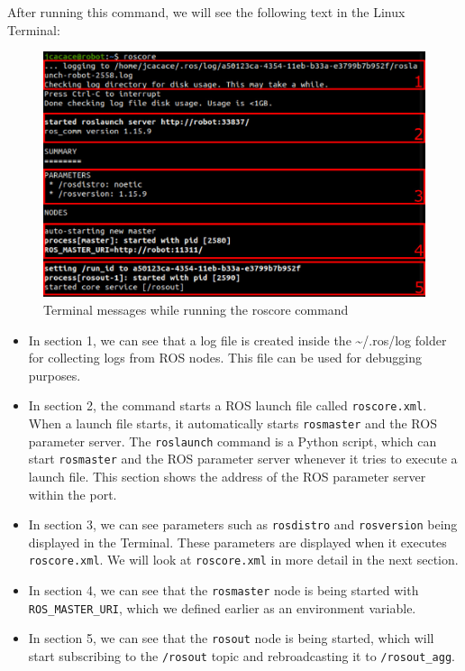 \documentclass[../../main]{subfiles}
\begin{document}
After running this command, we will see the following text in the Linux Terminal:
\begin{figure}[ht]
    \centering
    \includegraphics{img/roscore.jpg}
    \caption{Terminal messages while running the roscore command}
\end{figure}
\newpage
\begin{itemize}
    \item In section 1, we can see that a log file is created inside the \textasciitilde/.ros/log folder for collecting logs from ROS nodes. This file can be used for debugging purposes.
    \item In section 2, the command starts a ROS launch file called \texttt{roscore.xml}. When a launch file starts, it automatically starts \texttt{rosmaster} and the ROS parameter server. The \texttt{roslaunch} command is a Python script, which can start \texttt{rosmaster} and the ROS parameter server whenever it tries to execute a launch file. This section shows the address of the ROS parameter server within the port.
    \item In section 3, we can see parameters such as \texttt{rosdistro} and \texttt{rosversion} being displayed in the Terminal. These parameters are displayed when it executes \texttt{roscore.xml}. We will look at \texttt{roscore.xml} in more detail in the next section.
    \item In section 4, we can see that the \texttt{rosmaster} node is being started with \texttt{ROS\_MASTER\_URI}, which we defined earlier as an environment variable.
    \item In section 5, we can see that the \texttt{rosout} node is being started, which will start subscribing to the \texttt{/rosout} topic and rebroadcasting it to \texttt{/rosout\_agg}.
\end{itemize}
\end{document}
